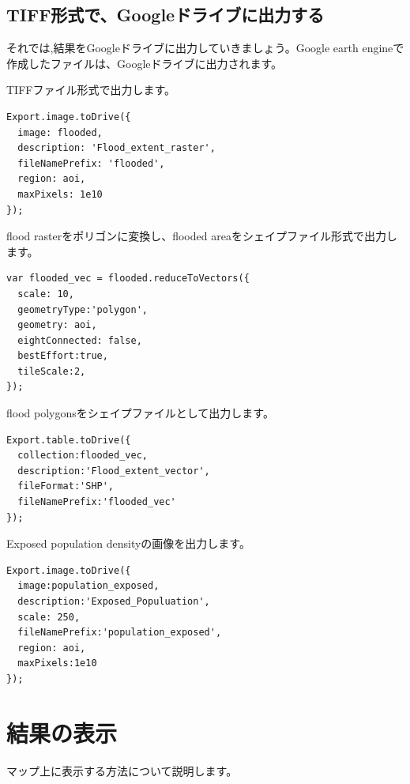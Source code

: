 \documentclass[
]{book}
\begin{document}
\hypertarget{tiffux5f62ux5f0fux3067googleux30c9ux30e9ux30a4ux30d6ux306bux51faux529bux3059ux308b}{%
\section{TIFF形式で、Googleドライブに出力する}\label{tiffux5f62ux5f0fux3067googleux30c9ux30e9ux30a4ux30d6ux306bux51faux529bux3059ux308b}}

それでは,結果をGoogleドライブに出力していきましょう。Google earth engineで作成したファイルは、Googleドライブに出力されます。

TIFFファイル形式で出力します。

\begin{verbatim}
Export.image.toDrive({
  image: flooded, 
  description: 'Flood_extent_raster',
  fileNamePrefix: 'flooded',
  region: aoi, 
  maxPixels: 1e10
});
\end{verbatim}

flood rasterをポリゴンに変換し、flooded areaをシェイプファイル形式で出力します。

\begin{verbatim}
var flooded_vec = flooded.reduceToVectors({
  scale: 10,
  geometryType:'polygon',
  geometry: aoi,
  eightConnected: false,
  bestEffort:true,
  tileScale:2,
});
\end{verbatim}

flood polygonsをシェイプファイルとして出力します。

\begin{verbatim}
Export.table.toDrive({
  collection:flooded_vec,
  description:'Flood_extent_vector',
  fileFormat:'SHP',
  fileNamePrefix:'flooded_vec'
});
\end{verbatim}

Exposed population densityの画像を出力します。

\begin{verbatim}
Export.image.toDrive({
  image:population_exposed,
  description:'Exposed_Populuation',
  scale: 250,
  fileNamePrefix:'population_exposed',
  region: aoi,
  maxPixels:1e10
});
\end{verbatim}

\hypertarget{ux7d50ux679cux306eux8868ux793a}{%
\chapter{結果の表示}\label{ux7d50ux679cux306eux8868ux793a}}

マップ上に表示する方法について説明します。
\end{document}
